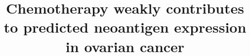 \documentclass{bmcart}
\begin{document}
\begin{frontmatter}

\begin{fmbox}


\title{Chemotherapy weakly contributes to predicted neoantigen expression in ovarian cancer}


\author[addressref={aff1}, email={timothy.odonnell@icahn.mssm.edu}]{ }
\author[addressref={aff2}, email={elizabeth.christie@petermac.org}]{ }
\author[addressref={aff1}, email={aahuja11@gmail.com}]{ }
\author[addressref={aff1}, email={jacqueline.buros@mssm.edu}]{ }
\author[addressref={aff1}, email={arman@hammerlab.org}]{ }
\author[addressref={aff2}, email={david.bowtell@petermac.org}]{ }
\author[addressref={aff3,aff5}, noteref={n1}, email={snyderca@mskcc.org}]{ }
\author[addressref={aff1,aff4}, noteref={n1}, corref={aff1}, email={Jeff.Hammerbacher@mssm.edu}]{ }




\end{fmbox}
\end{frontmatter}
\end{document}
